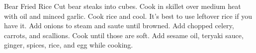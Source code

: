 \documentclass[../main.tex]{subfiles}
\begin{document}
\begin{recipe}{Bear Fried Rice}{}{}
    Cut bear steaks into cubes.
    Cook in skillet over medium heat with oil and minced garlic.
    Cook rice and cool. It's best to use leftover rice if you have it.
    Add onions to steam and saute until browned.
    Add chopped celery, carrots, and scallions. Cook until those are soft.
    Add sesame oil, teryaki sauce, ginger, spices, rice, and egg while cooking.
\end{recipe}
\end{document}
